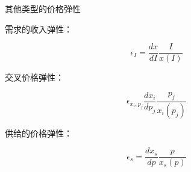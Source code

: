 \documentclass{article}
\begin{document}
\hspace*{\fill}

其他类型的价格弹性

需求的收入弹性：

\[
\epsilon_I=\frac{dx}{dI}\frac{I}{x(I)}
\]

交叉价格弹性：

\[
\epsilon_{x_i,p_j}\frac{dx_i}{dp_j}\frac{p_j}{x_i(p_j)}
\]

供给的价格弹性：

\[
\epsilon_s=\frac{dx_s}{dp}\frac{p}{x_s(p)}
\]










\hspace*{\fill}




















	
\end{document}
